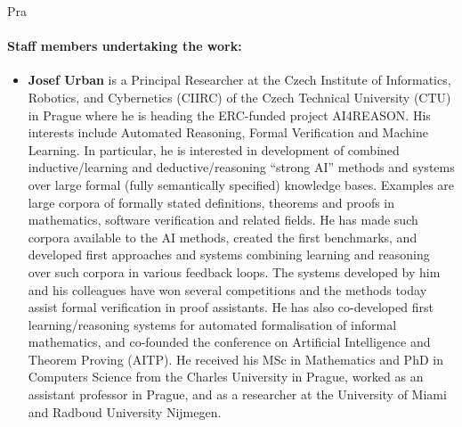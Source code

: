 \begin{sitedescription}{Pra}
\paragraph*{Staff members undertaking the work:}



\begin{itemize}
\item
\textbf{Josef Urban} is a Principal Researcher at the Czech Institute of Informatics, Robotics, and Cybernetics (CIIRC) of the Czech Technical University (CTU) in Prague where he is heading the ERC-funded project
AI4REASON. His interests include Automated Reasoning, Formal Verification and Machine Learning. In particular, he is interested in development of combined inductive/learning and deductive/reasoning
``strong AI'' methods and systems over large formal (fully semantically specified) knowledge bases. Examples are large corpora of formally stated definitions, theorems and proofs in mathematics, software
verification and related fields.  He has made such corpora available to the AI methods, created the first benchmarks, and developed first approaches and systems combining learning and reasoning over such
corpora in various feedback loops.  The systems developed by him and his colleagues have won several competitions and the methods today assist formal verification in proof assistants. He has also
co-developed first learning/reasoning systems for automated formalisation of informal mathematics, and co-founded the conference on Artificial Intelligence and Theorem Proving (AITP).
He received his MSc in Mathematics and PhD in Computers Science from
the Charles University in Prague, worked as an assistant professor in
Prague, and as a researcher at the University of Miami and Radboud
University Nijmegen.




\end{itemize}
\end{sitedescription}

